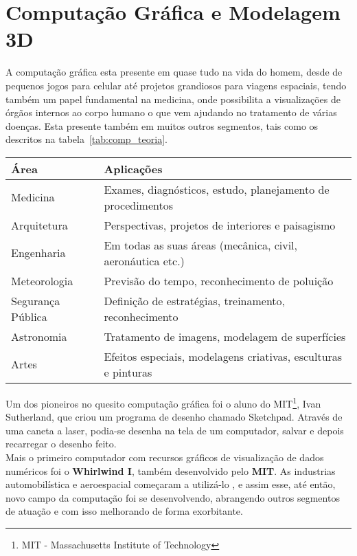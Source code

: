 \section{Computação Gráfica e Modelagem 3D}
A computação gráfica esta presente em quase tudo na vida do homem, desde de pequenos jogos para celular até projetos grandiosos para viagens espaciais, tendo também um papel fundamental na medicina, onde possibilita a visualizações de órgãos internos ao corpo humano o que vem ajudando no tratamento de várias doenças\cite{comp_grafica_h}\cite{azevedo}\cite{kirne}. Esta presente também em muitos outros segmentos, tais como os descritos na tabela~\ref{tab:comp_teoria}. \\

\begin{center}
\begin{tabular}{|l|l|}
	\hline
	Área & Aplicações \\ \hline
	Medicina &  Exames, diagnósticos, estudo, planejamento de procedimentos\\ \hline
	Arquitetura & Perspectivas, projetos de interiores e paisagismo\\ \hline
	Engenharia & Em todas as suas áreas (mecânica, civil, aeronáutica etc.)\\ \hline
	Meteorologia & Previsão do tempo, reconhecimento de poluição\\ \hline
	Segurança Pública & Definição de estratégias, treinamento, reconhecimento\\ \hline
	Astronomia & Tratamento de imagens, modelagem de superfícies\\ \hline
	Artes & Efeitos especiais, modelagens criativas, esculturas e pinturas\\
	\hline
\end{tabular}
\label{tab:comp_teoria}
\end{center}

Um dos pioneiros no quesito computação gráfica foi o aluno do MIT\footnote{MIT - Massachusetts Institute of Technology}, Ivan Sutherland, que criou um programa de desenho chamado Sketchpad\cite{sutherland}. Através de uma caneta a laser, podia-se desenha na tela de um computador, salvar e depois recarregar o desenho feito.\\

 Mais o primeiro computador com recursos gráficos de visualização de dados numéricos foi o \textbf{Whirlwind I}, também desenvolvido pelo \textbf{MIT}. As industrias automobilística e aeroespacial começaram a utilizá-lo , e assim esse, até então, novo campo da computação foi se desenvolvendo, abrangendo outros segmentos de atuação e com isso melhorando de forma exorbitante\cite{comp_grafica_h2}.  \\


